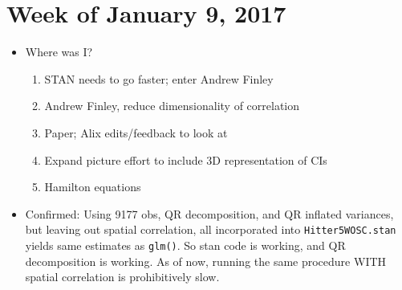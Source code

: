 \documentclass{article}
\begin{document}
\section*{Week of January 9, 2017} %
\begin{itemize}
\item Where was I?
  \begin{enumerate}
  \item STAN needs to go faster; enter Andrew Finley
  \item Andrew Finley, reduce dimensionality of correlation
  \item Paper; Alix edits/feedback to look at
  \item Expand picture effort to include 3D representation of CIs
  \item Hamilton equations
  \end{enumerate}
\item Confirmed: Using 9177 obs, QR decomposition, and QR inflated variances, but leaving out spatial correlation, all incorporated into \verb|Hitter5WOSC.stan| yields same estimates as \verb|glm()|. So stan code is working, and QR decomposition is working. As of now, running the same procedure WITH spatial correlation is prohibitively slow.

\end{itemize}
\end{document}
